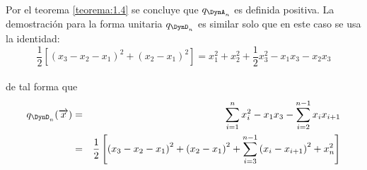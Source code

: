 \paragraph{}
Por el teorema \ref{teorema:1.4} se concluye que $q_{\DynA_{n}}$ es definida positiva. La demostración para la forma unitaria $q_{\DynD_{n}}$ es similar solo que en este caso se usa la identidad:
\begin{equation*}
    \frac{1}{2}\left[\left(x_{3} - x_{2} - x_{1}\right)^{2} + \left(x_{2} - x_{1}\right)^{2}\right] = x_{1}^{2} + x_{2}^{2} + \frac{1}{2}x_{3}^{2} - x_{1}x_{3} - x_{2}x_{3}
\end{equation*}
\paragraph{}
de tal forma que 
\begin{eqnarray*}
 q_{\DynD_{n}}(\overrightarrow{x}) &  =  & \sum_{i=1}^{n}x_{i}^{2} - x_{1}x_{3} -  \sum_{i=2}^{n-1} x_{i}x_{i+1}\\
 &  =  & \frac{1}{2}\left[\left(x_{3} - x_{2} - x_{1}\right)^{2} + \left(x_{2} - x_{1}\right)^{2} + \sum_{i=3}^{n-1}\left(x_{i} - x_{i+1}\right)^{2}  + x_{n}^{2}\right]
\end{eqnarray*}
